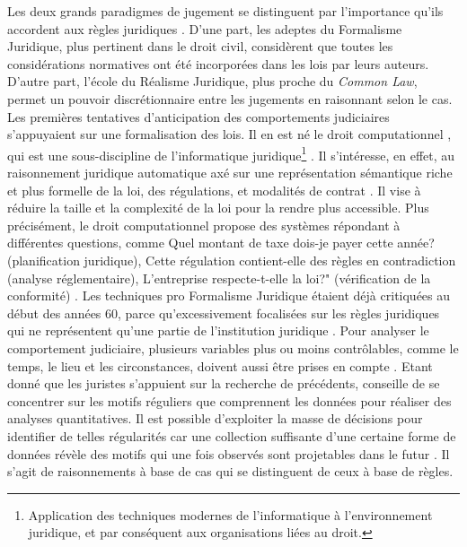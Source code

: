 Les deux grands paradigmes de jugement se distinguent par l'importance qu'ils accordent aux règles juridiques \citep{tumonis2012legalrealism}. D'une part, les adeptes du Formalisme Juridique, plus pertinent dans le droit civil, considèrent que toutes les considérations normatives ont été incorporées dans les lois par leurs auteurs. D'autre part, l'école du Réalisme Juridique, plus proche du \og \textit{Common Law}\fg{}, permet un pouvoir discrétionnaire entre les jugements en raisonnant selon le cas. Les premières tentatives d'anticipation des comportements judiciaires s'appuyaient sur une formalisation des lois. Il en est né le \og droit computationnel \fg{}, qui est une sous-discipline de  l'\og informatique juridique\footnote{Application des techniques modernes de l'informatique à l'environnement juridique, et par conséquent aux organisations liées au droit.} \fg{}. Il  s'intéresse, en effet, au raisonnement juridique automatique axé sur une représentation sémantique riche et plus formelle de la loi, des régulations, et modalités de contrat \citep{love2005computationallaw}. Il vise à réduire la taille et la complexité de la loi pour la rendre plus accessible. Plus précisément, le \og droit computationnel \fg{} propose des systèmes répondant à différentes questions, comme \og Quel montant de taxe dois-je payer cette année? \fg{} (planification juridique), \og Cette régulation contient-elle des règles en contradiction\fg{} (analyse réglementaire),  \og L'entreprise respecte-t-elle la loi?" (vérification de la conformité) \citep{Genesereth2015computationallaw}. Les techniques pro Formalisme Juridique étaient déjà critiquées au début des années 60, parce qu'excessivement focalisées sur les règles juridiques qui ne représentent qu'une partie de l'institution juridique \citep{llewellyn1962jurisprudence}. Pour analyser le comportement judiciaire, plusieurs variables plus ou moins contrôlables, comme le temps, le lieu et les circonstances, doivent aussi être prises en compte \citep{ulmer1963quantitative}. Etant donné que les juristes s'appuient sur la recherche de précédents, \citet{ulmer1963quantitative} conseille de se concentrer sur les motifs réguliers que comprennent les données pour réaliser des analyses quantitatives. Il est possible d'exploiter la masse de décisions pour identifier de telles régularités car une collection suffisante d'une certaine forme de données révèle des motifs qui une fois observés sont projetables dans le futur \citep{ulmer1963quantitative}. Il s'agit de raisonnements à base de cas qui se distinguent de ceux à base de règles.

